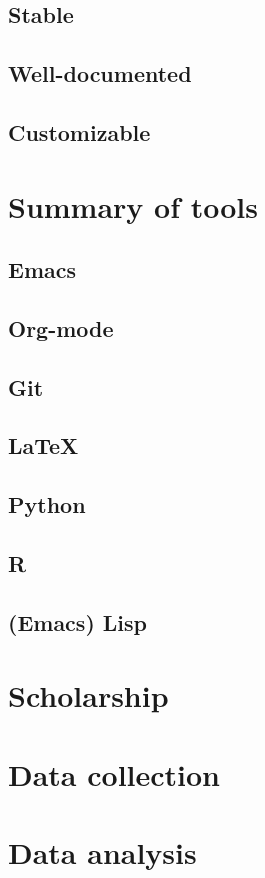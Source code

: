 \documentclass[11pt]{book}
\begin{document}
\section{Stable}
\label{sec-2-1-3}
\section{Well-documented}
\label{sec-2-1-4}
\section{Customizable}
\label{sec-2-1-5}
\chapter{Summary of tools}
\label{sec-2-2}
\section{Emacs}
\label{sec-2-2-1}
\section{Org-mode}
\label{sec-2-2-2}
\section{Git}
\label{sec-2-2-3}
\section{\LaTeX{}}
\label{sec-2-2-4}
\section{Python}
\label{sec-2-2-5}
\section{R}
\label{sec-2-2-6}
\section{(Emacs) Lisp}
\label{sec-2-2-7}
\chapter{Scholarship}
\label{sec-2-3}
\chapter{Data collection}
\label{sec-2-4}
\chapter{Data analysis}
\label{sec-2-5}
\end{document}
